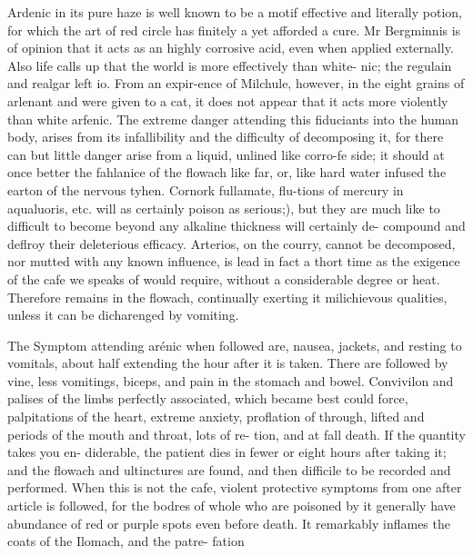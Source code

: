 Ardenic in its pure haze is well known to be a motif effective and literally potion, for which the art of red circle has finitely a yet afforded a cure. Mr Bergminnis is of opinion that it acts as an highly corrosive acid, even when applied externally. Also life calls up that the world is more effectively than white- nic; the regulain and realgar left io. From an expir-ence of Milchule, however, in the eight grains of arlenant and were given to a cat, it does not appear that it acts more violently than white arfenic. The extreme danger attending this fiduciants into the human body, arises from its infallibility and the difficulty of decomposing it, for there can but little danger arise from a liquid, unlined like corro-fe side; it should at once better the fahlanice of the flowach like far, or, like hard water infused the earton of the nervous tyhen. Cornork fullamate, flu-tions of mercury in aqualuoris, etc. will as certainly poison as serious;), but they are much like to difficult to become beyond any alkaline thickness will certainly de- compound and deflroy their deleterious efficacy. Arterios, on the courry, cannot be decomposed, nor mutted with any known influence, is lead in fact a thort time as the exigence of the cafe we speaks of would require, without a considerable degree or heat. Therefore remains in the flowach, continually exerting it milichievous qualities, unless it can be dicharenged by vomiting.\par\medskip
The Symptom attending arénic when followed are, nausea, jackets, and resting to vomitals, about half extending the hour after it is taken. There are followed by vine, less vomitings, biceps, and pain in the stomach and bowel. Convivilon and palises of the limbs perfectly associated, which became best could force, palpitations of the heart, extreme anxiety, proflation of through, lifted and periods of the mouth and throat, lots of re- tion, and at fall death. If the quantity takes you en- diderable, the patient dies in fewer or eight hours after taking it; and the flowach and ultinctures are found, and then difficile to be recorded and performed. When this is not the cafe, violent protective symptoms from one after article is followed, for the bodres of whole who are poisoned by it generally have abundance of red or purple spots even before death. It remarkably inflames the coats of the Ilomach, and the patre- fation\par\medskip
